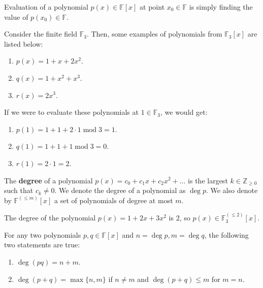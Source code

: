 \documentclass[../lecture-notes.tex]{subfiles}
\begin{document}
\begin{definition}
    Evaluation of a polynomial $p(x) \in \mathbb{F}[x]$ at point $x_0 \in \mathbb{F}$ is simply finding the value of $p(x_0) \in \mathbb{F}$.
\end{definition}

\begin{example}
    Consider the finite field $\mathbb{F}_3$. Then, some examples of polynomials from $\mathbb{F}_3[x]$ are listed below:
    \begin{enumerate}
        \item $p(x) = 1 + x + 2x^2$.
        \item $q(x) = 1 + x^2 + x^3$.
        \item $r(x) = 2x^3$.
    \end{enumerate}

   If we were to evaluate these polynomials at $1 \in \mathbb{F}_3$, we would get:
    \begin{enumerate}
        \item $p(1) = 1 + 1 + 2 \cdot 1 \; \text{mod} \; 3 = 1$.
        \item $q(1) = 1 + 1 + 1 \; \text{mod} \; 3 = 0$.
        \item $r(1) = 2 \cdot 1 = 2$.
    \end{enumerate}
\end{example}

\begin{definition}
    The \textbf{degree} of a polynomial $p(x) = c_0+c_1x+c_2x^2+\dots$ is the largest $k \in \mathbb{Z}_{\geq 0}$ such that $c_k \neq 0$. We denote the degree of a polynomial as $\deg p$. We also denote by $\mathbb{F}^{(\leq m)}[x]$ a set of polynomials of degree at most $m$.
\end{definition}

\begin{example}
    The degree of the polynomial $p(x) = 1 + 2x + 3x^2$ is $2$, so $p(x) \in \mathbb{F}_3^{(\leq 2)}[x]$.
\end{example}

\begin{theorem}
    For any two polynomials $p,q \in \mathbb{F}[x]$ and $n = \deg p, m = \deg q$, the following two statements are true:
    \begin{enumerate}
        \item $\deg (pq) = n + m$.
        \item $\deg (p + q) = \max\{n,m\}$ if $n \neq m$ and $\deg (p+q) \leq m$ for $m=n$.
    \end{enumerate}
\end{theorem}
\end{document}
